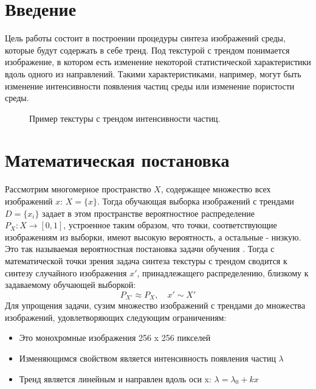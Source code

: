 \documentclass[a4paper]{article}
\begin{document}
	\section{Введение}
		Цель работы состоит в построении процедуры синтеза изображений среды, которые будут содержать в себе тренд. Под текстурой с трендом понимается изображение, в котором есть изменение некоторой статистической характеристики вдоль одного из направлений. Такими характеристиками, например, могут быть изменение интенсивности появления частиц среды или изменение пористости среды. \\
		\begin{figure}[h]
			\caption{Пример текстуры с трендом интенсивности частиц.}
			\label{trend-example}
		\end{figure}
	\section{Математическая постановка}
		Рассмотрим многомерное пространство $X$, содержащее множество всех изображений $x$: $X = \{x\}$. Тогда обучающая выборка изображений с трендами $D = \{x_i\}$ задает в этом пространстве вероятностное распределение $P_X : X \longrightarrow [0,1]$, устроенное таким образом, что точки, соответствующие изображениям из выборки, имеют высокую вероятность, а остальные - низкую. Это так называемая вероятностная постановка задачи обучения \cite{Voron-ML, GAN}. Тогда с математической точки зрения задача синтеза текстуры с трендом сводится к синтезу случайного изображения $x'$, принадлежащего распределению, близкому к задаваемому обучающей выборкой:
		$$ P_{X'} \approx P_X, \quad x' \sim X'$$
		Для упрощения задачи, сузим множество изображений с трендами до множества изображений, удовлетворяющих следующим ограничениям:
		\begin{itemize}
			\item Это монохромные изображения 256 x 256 пикселей
			\item Изменяющимся свойством является интенсивность появления частиц $\lambda$
			\item Тренд является линейным и направлен вдоль оси x: 
			$ \lambda = \lambda_0 + kx $
		\end{itemize}
\end{document}
